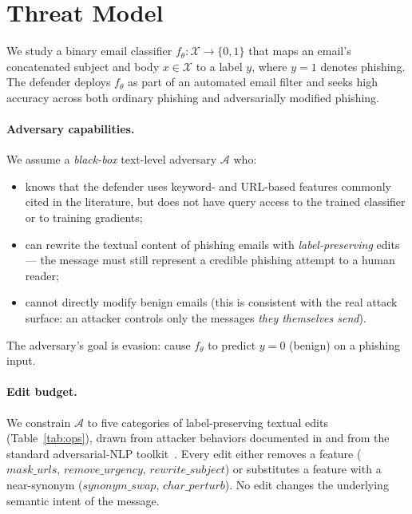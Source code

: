 \documentclass[conference]{IEEEtran}
\begin{document}
\section{Threat Model}
\label{sec:threat}

We study a binary email classifier $f_\theta : \mathcal{X} \rightarrow
\{0, 1\}$ that maps an email's concatenated subject and body
$x \in \mathcal{X}$ to a label $y$, where $y\!=\!1$ denotes phishing.
The defender deploys $f_\theta$ as part of an automated email filter and
seeks high accuracy across both ordinary phishing and adversarially
modified phishing.

\paragraph{Adversary capabilities.} We assume a \emph{black-box} text-level
adversary $\mathcal{A}$ who:
\begin{itemize}
  \item knows that the defender uses keyword- and URL-based features
        commonly cited in the literature, but does not have query access
        to the trained classifier or to training gradients;
  \item can rewrite the textual content of phishing emails with
        \emph{label-preserving} edits --- the message must still represent
        a credible phishing attempt to a human reader;
  \item cannot directly modify benign emails (this is consistent with the
        real attack surface: an attacker controls only the messages
        \emph{they themselves send}).
\end{itemize}
The adversary's goal is evasion: cause $f_\theta$ to predict $y\!=\!0$
(benign) on a phishing input.

\paragraph{Edit budget.} We constrain $\mathcal{A}$ to five categories of
label-preserving textual edits (Table~\ref{tab:ops}), drawn from
attacker behaviors documented in
\cite{kim2025llms,phishmaster2025,robustllmphish2025} and from the standard
adversarial-NLP toolkit~\cite{textattack2020}. Every edit either removes
a feature ($\mathit{mask\_urls}$, $\mathit{remove\_urgency}$,
$\mathit{rewrite\_subject}$) or substitutes a feature with a near-synonym
($\mathit{synonym\_swap}$, $\mathit{char\_perturb}$). No edit changes the
underlying semantic intent of the message.
\end{document}
